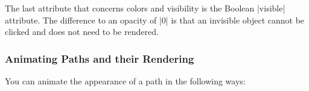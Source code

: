 \begin{codeexample}[width=2.3cm]
\end{codeexample}

The last attribute that concerns colors and visibility is the
Boolean |visible| attribute. The difference to an opacity of |0| is
that an invisible object cannot be clicked and does not need to be
rendered. 

\begin{codeexample}[width=2.3cm]
\end{codeexample}


\subsubsection{Animating Paths and their Rendering}
\label{section-base-animation-paths}

You can animate the appearance of a path in the following ways:

